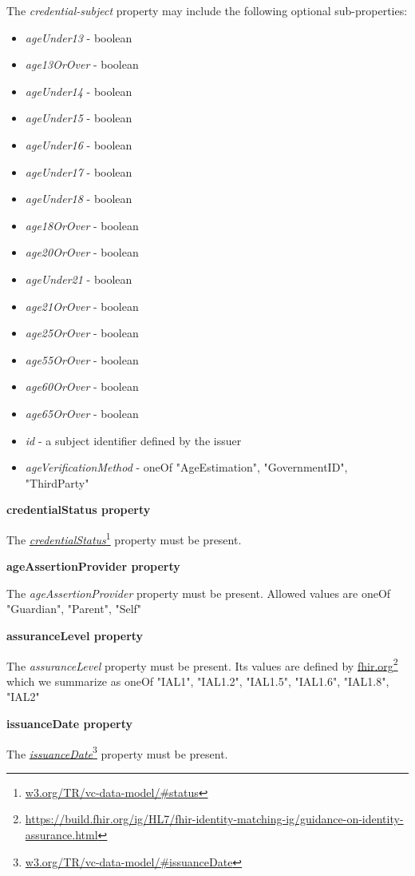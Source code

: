 \documentclass[11pt, oneside]{article}   	%
\newcommand{\hyperfootnote}[1][]{\def\ArgI{{#1}}\hyperfootnoteRelay}
\newcommand\hyperfootnoteRelay[2][]{\href{#1#2}{\ArgI}\footnote{\href{#1#2}{#2}}}
\begin{document}
The \emph{credential-subject} property may include the following optional sub-properties:
\begin{itemize}
	\item \emph{ageUnder13} - boolean
	\item \emph{age13OrOver} - boolean
	\item \emph{ageUnder14} - boolean
	\item \emph{ageUnder15} - boolean
	\item \emph{ageUnder16} - boolean
	\item \emph{ageUnder17} - boolean
	\item \emph{ageUnder18} - boolean
	\item \emph{age18OrOver} - boolean
	\item \emph{age20OrOver} - boolean
	\item \emph{ageUnder21} - boolean
	\item \emph{age21OrOver} - boolean
	\item \emph{age25OrOver} - boolean
	\item \emph{age55OrOver} - boolean
	\item \emph{age60OrOver} - boolean
	\item \emph{age65OrOver} - boolean
	\item \emph{id} - a subject identifier defined by the issuer
	\item \emph{ageVerificationMethod} - oneOf {"AgeEstimation", "GovernmentID", "ThirdParty"}
\end{itemize}

\textbf{credentialStatus property}

The \hyperfootnote[\emph{credentialStatus}][https://]{w3.org/TR/vc-data-model/\#status} property must be present.

\textbf{ageAssertionProvider property}

The \emph{ageAssertionProvider} property must be present. Allowed values are oneOf {"Guardian", "Parent", "Self"}

\textbf{assuranceLevel property}

The \emph{assuranceLevel} property must be present. Its values are defined by \hyperfootnote[fhir.org][https://]{https://build.fhir.org/ig/HL7/fhir-identity-matching-ig/guidance-on-identity-assurance.html} which we summarize as oneOf {"IAL1", "IAL1.2", "IAL1.5", "IAL1.6", "IAL1.8", "IAL2"}

\textbf{issuanceDate property}

The \hyperfootnote[\emph{issuanceDate}][https://]{w3.org/TR/vc-data-model/\#issuanceDate} property must be present.
\end{document}
